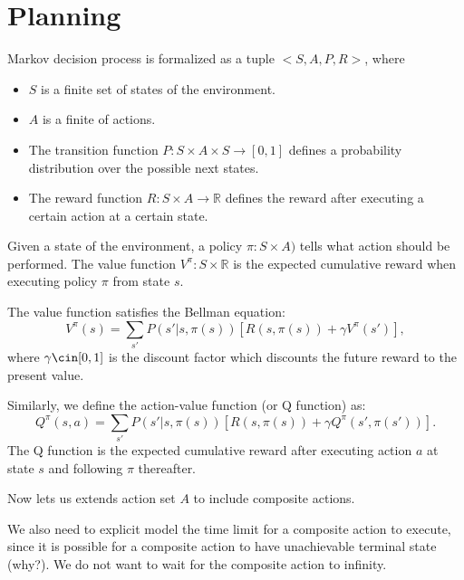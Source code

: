 \chapter{Planning}

\begin{definition} Markov decision process is formalized as a tuple $<S, A, P, R>$, where
\begin{itemize}{}
\item $S$ is a finite set of states of the environment.
\item $A$ is a finite of actions.
\item The transition function $P:S \times A \times S \rightarrow [0, 1]$ defines a probability distribution over the possible next states. 
\item The reward function $R:S \times A \rightarrow \mathbb{R}$ defines the reward after executing a certain action at a certain state.
\end{itemize}
\end{definition}

Given a state of the environment, a policy $\pi: S \times A)$ tells what action should be performed. 
The value function $V^{\pi}: S \times \mathbb{R}$ is the expected cumulative reward when executing
policy $\pi$ from state $s$.

The value function satisfies the Bellman equation:
\begin{equation}
    V^{\pi}(s) = \sum_{s'}P(s'|s, \pi(s))[R(s, \pi(s)) + \gamma V^{\pi}(s')],
\end{equation}
where $\gamma \cin [0, 1]$ is the discount factor which discounts the future reward to the present value.

Similarly, we define the action-value function (or Q function) as:
\begin{equation}
    Q^{\pi}(s, a) = \sum_{s'}P(s'|s, \pi(s))[R(s, \pi(s)) + \gamma Q^{\pi}(s', \pi(s'))].
\end{equation}
The Q function is the expected cumulative reward after executing action $a$ at state $s$ and following
$\pi$ thereafter.

Now lets us extends action set $A$ to include composite actions.

We also need to explicit model the time limit for a composite action to execute, since it
is possible for a composite action to have unachievable terminal state (why?). We do not want 
to wait for the composite action to infinity.


